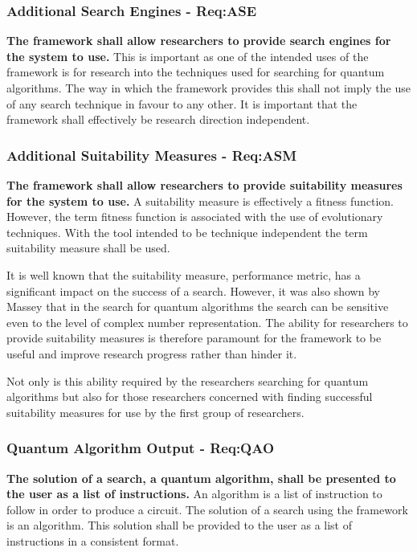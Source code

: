 \subsubsection{Additional Search Engines - Req:ASE}
\label{sec:reqase}
\textbf{The framework shall allow researchers to provide search engines for the system to use.}
This is important as one of the intended uses of the framework is for research into the techniques used for searching for quantum algorithms.
The way in which the framework provides this shall not imply the use of any search technique in favour to any other.
It is important that the framework shall effectively be research direction independent.

\subsubsection{Additional Suitability Measures - Req:ASM}
\label{sec:reqasm}
\textbf{The framework shall allow researchers to provide suitability measures for the system to use.}
A suitability measure is effectively a fitness function.
However, the term fitness function is associated with the use of evolutionary techniques.
With the tool intended to be technique independent the term suitability measure shall be used.

It is well known that the suitability measure, performance metric, has a significant impact on the success of a search.
However, it was also shown by Massey\cite{masseythesis} that in the search for quantum algorithms the search can be sensitive even to the level of complex number representation.
The ability for researchers to provide suitability measures is therefore paramount for the framework to be useful and improve research progress rather than hinder it.

Not only is this ability required by the researchers searching for quantum algorithms but also for those researchers concerned with finding successful suitability measures for use by the first group of researchers.

\subsubsection{Quantum Algorithm Output - Req:QAO}
\label{sec:reqqao}
\textbf{The solution of a search, a quantum algorithm, shall be presented to the user as a list of instructions.}
An algorithm is a list of instruction to follow in order to produce a circuit.
The solution of a search using the framework is an algorithm.
This solution shall be provided to the user as a list of instructions in a consistent format.

